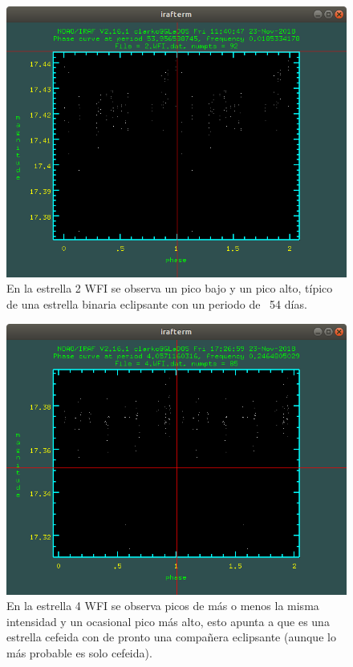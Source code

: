 \documentclass[12pt]{article}
\begin{document}
\begin{figure}[H]
  \centering
   \includegraphics[scale = 0.5]{2.png}
  \caption{En la estrella 2 WFI se observa un pico bajo y un pico alto, típico de una estrella binaria eclipsante con un periodo de ~54 días.}
  \label{figura}
\end{figure}

\begin{figure}[H]
  \centering
   \includegraphics[scale = 0.5]{4.png}
  \caption{En la estrella 4 WFI se observa picos de más o menos la misma intensidad y un ocasional pico más alto, esto apunta a que es una estrella cefeida con de pronto una compañera eclipsante (aunque lo más probable es solo cefeida).}
  \label{figura}
\end{figure}
\end{document}
